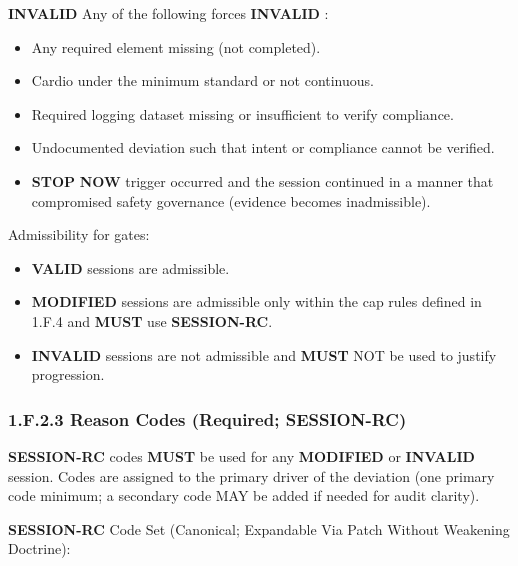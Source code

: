 \documentclass[10pt]{article}
\begin{document}
\textbf{INVALID} 
Any of the following forces \textbf{INVALID} :

\begin{itemize}
\item Any required element missing (not completed).
\item Cardio under the minimum standard or not continuous.
\item Required logging dataset missing or insufficient to verify compliance.
\item Undocumented deviation such that intent or compliance cannot be verified.
\item \textbf{STOP} \textbf{NOW} trigger occurred and the session continued in a manner that compromised safety governance (evidence becomes inadmissible).
\end{itemize}

Admissibility for gates:

\begin{itemize}
\item \textbf{VALID} sessions are admissible.
\item \textbf{MODIFIED} sessions are admissible only within the cap rules defined in 1.F.4 and \textbf{MUST} use \textbf{SESSION-RC}.
\item \textbf{INVALID} sessions are not admissible and \textbf{MUST} NOT be used to justify progression.
\end{itemize}

\subsubsection*{1.F.2.3 Reason Codes (Required; \textbf{SESSION-RC})}

\textbf{SESSION-RC} codes \textbf{MUST} be used for any \textbf{MODIFIED} or \textbf{INVALID} session. Codes are assigned to the primary driver of the deviation (one primary code minimum; a secondary code MAY be added if needed for audit clarity).

\textbf{SESSION-RC} Code Set (Canonical; Expandable Via Patch Without Weakening Doctrine):
\end{document}

